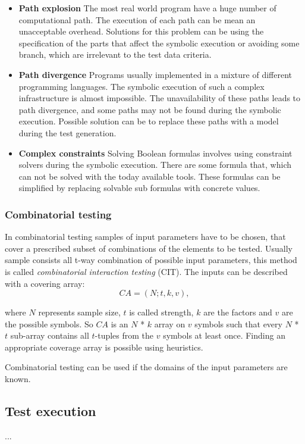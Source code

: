 \begin{itemize}
	\item \textbf{Path explosion} The most real world program have a huge number of computational path. The execution of each path can be mean an unacceptable overhead. Solutions for this problem can be using the specification of the parts that affect the symbolic execution or avoiding some branch, which are irrelevant to the test data criteria.
	\item \textbf{Path divergence} Programs usually implemented in a mixture of different programming languages. The symbolic execution of such a complex infrastructure is almost impossible. The unavailability of these paths leads to path divergence, and some paths may not be found during the symbolic execution. Possible solution can be to replace these paths with a model during the test generation.
	\item \textbf{Complex constraints} Solving Boolean formulas involves using constraint solvers during the symbolic execution. There are some formula that, which can not be solved with the today available tools. These formulas can be simplified by replacing solvable sub formulas with concrete values.
\end{itemize}


\subsubsection{Combinatorial testing}
\label{ssub:combinatorialtesting}

In combinatorial testing samples of input parameters have to be chosen, that cover a prescribed subset of combinations of the elements to be tested. Usually sample consists all t-way combination of possible input parameters, this method is called \textit{combinatorial interaction testing} (CIT). The inputs can be described with a covering array:
\begin{displaymath}
CA=(N;t, k, v),
\end{displaymath}

where $N$ represents sample size, $t$ is called strength, $k$ are the factors and $v$ are the possible symbols. So $CA$ is an $N$ * $k$ array on $v$ symbols such that every $N$ * $t$ sub-array contains all $t$-tuples from the $v$ symbols at least once. Finding an appropriate coverage array is possible using heuristics.

Combinatorial testing can be used if the domains of the input parameters are known.



\subsection{Test execution}
\label{sub:testexecution}

...




